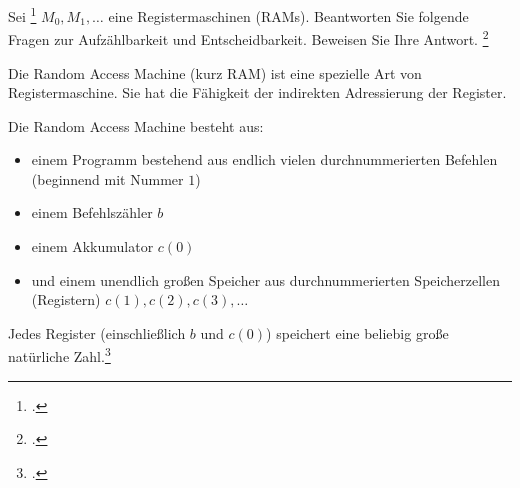 \documentclass{bschlangaul-aufgabe}
\begin{document}

Sei \footcite{examen:66115:2016:09} $M_0, M_1,
\dots$ eine Registermaschinen (RAMs). Beantworten Sie folgende Fragen
zur Aufzählbarkeit und Entscheidbarkeit. Beweisen Sie Ihre Antwort.
\footcite[Seite 8, Aufgabe 6]{theo:ab:4}

\begin{bExkurs}
Die Random Access Machine (kurz RAM) ist eine spezielle Art von
Registermaschine. Sie hat die Fähigkeit der indirekten Adressierung der
Register.

Die Random Access Machine besteht aus:

\begin{itemize}
\item einem Programm bestehend aus endlich vielen durchnummerierten
Befehlen (beginnend mit Nummer $1$)

\item einem Befehlszähler $b$

\item einem Akkumulator $c(0)$

\item und einem unendlich großen Speicher aus durchnummerierten
Speicherzellen (Registern) $c(1), c(2), c(3), \dots$
\end{itemize}

Jedes Register (einschließlich $b$ und $c(0)$) speichert eine beliebig
große natürliche Zahl.\footcite{wiki:registermaschine}
\end{bExkurs}
\end{document}
